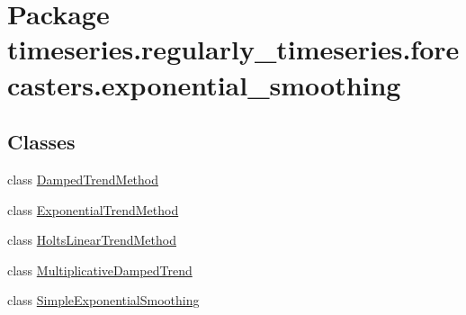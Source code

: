 \hypertarget{namespacetimeseries_1_1regularly__timeseries_1_1forecasters_1_1exponential__smoothing}{}\section{Package timeseries.\+regularly\+\_\+timeseries.\+forecasters.\+exponential\+\_\+smoothing}
\label{namespacetimeseries_1_1regularly__timeseries_1_1forecasters_1_1exponential__smoothing}
\subsection*{Classes}
\begin{DoxyCompactItemize}
\item 
class \hyperlink{classtimeseries_1_1regularly__timeseries_1_1forecasters_1_1exponential__smoothing_1_1_damped_trend_method}{Damped\+Trend\+Method}
\item 
class \hyperlink{classtimeseries_1_1regularly__timeseries_1_1forecasters_1_1exponential__smoothing_1_1_exponential_trend_method}{Exponential\+Trend\+Method}
\item 
class \hyperlink{classtimeseries_1_1regularly__timeseries_1_1forecasters_1_1exponential__smoothing_1_1_holts_linear_trend_method}{Holts\+Linear\+Trend\+Method}
\item 
class \hyperlink{classtimeseries_1_1regularly__timeseries_1_1forecasters_1_1exponential__smoothing_1_1_multiplicative_damped_trend}{Multiplicative\+Damped\+Trend}
\item 
class \hyperlink{classtimeseries_1_1regularly__timeseries_1_1forecasters_1_1exponential__smoothing_1_1_simple_exponential_smoothing}{Simple\+Exponential\+Smoothing}
\end{DoxyCompactItemize}
